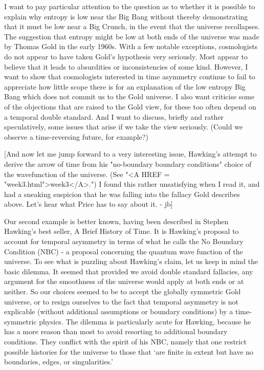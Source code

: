 I want to pay particular attention to the question as to whether it is
possible to explain why entropy is low near the Big Bang without thereby
demonstrating that it must be low near a Big Crunch, in the event that
the universe recollapses. The suggestion that entropy might be low at
both ends of the universe was made by Thomas Gold in the early 1960s.
With a few notable exceptions, cosmologists do not appear to have taken
Gold's hypothesis very seriously. Most appear to believe that it leads
to absurdities or inconsistencies of some kind.  However, I want to show
that cosmologists interested in time asymmetry continue to fail to
appreciate how little scope there is for an explanation of the low
entropy Big Bang which does not commit us to the Gold universe.  I also
want criticise some of the objections that are raised to the Gold view,
for these too often depend on a temporal double standard. And I want to
discuss, briefly and rather speculatively, some issues that arise if we
take the view seriously. (Could we observe a time-reversing future, for
example?)

[And now let me jump forward to a very interesting issue, Hawking's
attempt to derive the arrow of time from his "no-boundary boundary
conditions" choice of the wavefunction of the universe.  (See "<A HREF = "week3.html">week3</A>.")
I found this rather unsatisfying when I read it, and had a sneaking
suspicion that he was falling into the fallacy Gold describes above.
Let's hear what Price has to say about it. - jb]

Our second example is better known, having been described in Stephen
Hawking's best seller, A Brief History of Time.  It is Hawking's
proposal to account for temporal asymmetry in terms of what he calls the
No Boundary Condition (NBC) - a proposal concerning the quantum wave
function of the universe. To see what is puzzling about Hawking's claim,
let us keep in mind the basic dilemma.  It seemed that provided we avoid
double standard fallacies, any argument for the smoothness of the
universe would apply at both ends or at neither. So our choices seemed
to be to accept the globally symmetric Gold universe, or to resign
ourselves to the fact that temporal asymmetry is not explicable (without
additional assumptions or boundary conditions) by a time-symmetric
physics.  The dilemma is particularly acute for Hawking, because he has
a more reason than most to avoid resorting to additional boundary
conditions. They conflict with the spirit of his NBC, namely that one
restrict possible histories for the universe to those that `are finite
in extent but have no boundaries, edges, or singularities.'

